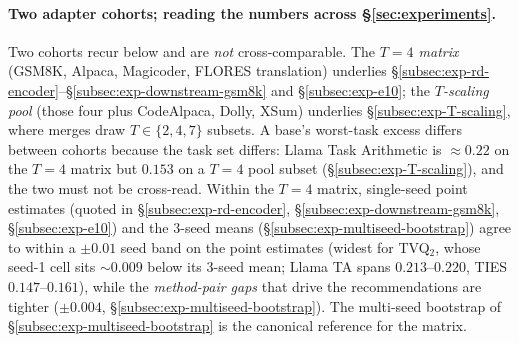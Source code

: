 \paragraph{Two adapter cohorts; reading the numbers across
\S\ref{sec:experiments}.} Two cohorts recur below and are \emph{not}
cross-comparable. The \emph{$T=4$ matrix} (GSM8K, Alpaca, Magicoder,
FLORES translation) underlies
\S\ref{subsec:exp-rd-encoder}--\S\ref{subsec:exp-downstream-gsm8k}
and \S\ref{subsec:exp-e10}; the \emph{$T$-scaling pool} (those four
plus CodeAlpaca, Dolly, XSum) underlies \S\ref{subsec:exp-T-scaling},
where merges draw $T \in \{2,4,7\}$ subsets. A base's worst-task
excess differs between cohorts because the task set differs: Llama
Task Arithmetic is $\approx 0.22$ on the $T=4$ matrix but $0.153$ on
a $T=4$ pool subset (\S\ref{subsec:exp-T-scaling}), and the two must
not be cross-read. Within the $T=4$ matrix, single-seed point
estimates (quoted in \S\ref{subsec:exp-rd-encoder},
\S\ref{subsec:exp-downstream-gsm8k}, \S\ref{subsec:exp-e10}) and the
$3$-seed means (\S\ref{subsec:exp-multiseed-bootstrap}) agree to
within a $\pm 0.01$ seed band on the point estimates (widest for
TVQ$_2$, whose seed-1 cell sits $\sim 0.009$ below its $3$-seed mean;
Llama TA spans $0.213$--$0.220$, TIES $0.147$--$0.161$), while the
\emph{method-pair gaps} that drive the recommendations are tighter
($\pm 0.004$, \S\ref{subsec:exp-multiseed-bootstrap}). The multi-seed
bootstrap of \S\ref{subsec:exp-multiseed-bootstrap} is the canonical
reference for the matrix.
